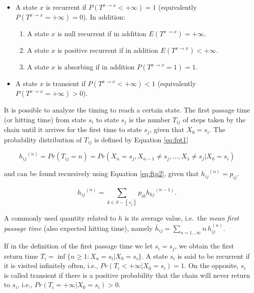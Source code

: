 \documentclass[
  nojss]{jss}
\providecommand{\tightlist}{%
  \setlength{\itemsep}{0pt}\setlength{\parskip}{0pt}}
\begin{document}
\begin{itemize}
\tightlist
\item
  A state \(x\) is recurrent if \(P(T^{x\rightarrow x}<+\infty)=1\) (equivalently \(P(T^{x\rightarrow x}=+\infty)=0\)). In addition:

  \begin{enumerate}
  \def\labelenumi{\arabic{enumi}.}
  \tightlist
  \item
    A state \(x\) is null recurrent if in addition \(E(T^{x\rightarrow x})=+\infty\).
  \item
    A state \(x\) is positive recurrent if in addition \(E(T^{x\rightarrow x})<+\infty\).
  \item
    A state \(x\) is absorbing if in addition \(P(T^{x\rightarrow x}=1)=1\).
  \end{enumerate}
\item
  A state \(x\) is transient if \(P(T^{x\rightarrow x}<+\infty)<1\) (equivalently \(P(T^{x\rightarrow x}=+\infty)>0\)).
\end{itemize}

It is possible to analyze the timing to reach a certain state. The first passage time (or hitting time) from state \(s_{i}\) to state \(s_{j}\) is the number \(T_{ij}\) of steps taken by the chain until it arrives for the first time to state \(s_{j}\), given that \(X_{0} = s_{i}\). The probability distribution of \(T_{ij}\) is defined by Equation \ref{eq:fpt1}

\begin{equation}
{h_{ij}}^{\left( n \right)} = Pr\left( {T_{ij} = n} \right) = Pr\left( X_n = s_j,X_{n - 1} \ne s_{j}, \ldots ,X_1 \ne s_j |X_0 = s_i \right)
\label{eq:fpt1}
\end{equation}

and can be found recursively using Equation \ref{eq:ftp2}, given that \({h_{ij}}^{\left( n \right)} = p_{ij}\).

\begin{equation}
{h_{ij}}^{\left( n \right)} = \sum\limits_{k \in S - \left\{ s_{j} \right\}}^{} {{p_{ik}}{h_{kj}}^{\left( {n - 1} \right)}}.
\label{eq:ftp2}
\end{equation}

A commonly used quantity related to \(h\) is its average value,
i.e.~the \emph{mean first passage time} (also expected hitting time), namely
\(\bar h_{ij}= \sum_{n=1\dots\infty} n \,h_{ij}^{(n)}\).

If in the definition of the first passage time we let \(s_{i}=s_{j}\), we obtain the first return time \(T_{i}=\inf \{ n\geq1:X_{n}=s_{i}|X_{0}=s_{i} \}\). A state \(s_{i}\) is said to be recurrent if it is visited infinitely often, i.e., \(Pr(T_{i}<+\infty|X_{0}=s_{i})=1\). On the opposite, \(s_{i}\) is called transient if there is a positive probability that the chain will never return to \(s_{i}\), i.e., \(Pr(T_{i}=+\infty|X_{0}=s_{i})>0\).
\end{document}
